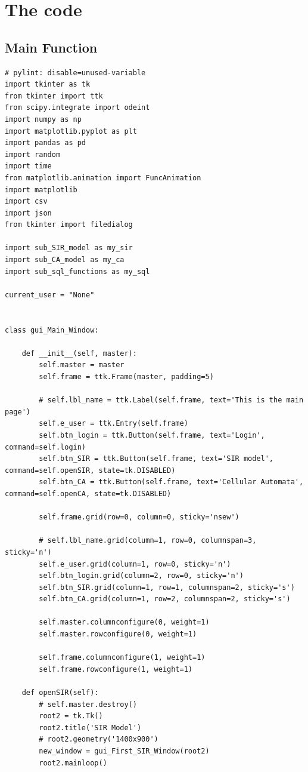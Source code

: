 \documentclass[11pt, a4paper]{article}
\begin{document}
\newpage
\newpage
\section{The code}

\subsection{Main Function}
\begin{lstlisting}
# pylint: disable=unused-variable
import tkinter as tk
from tkinter import ttk
from scipy.integrate import odeint
import numpy as np
import matplotlib.pyplot as plt
import pandas as pd
import random
import time
from matplotlib.animation import FuncAnimation
import matplotlib
import csv
import json
from tkinter import filedialog

import sub_SIR_model as my_sir
import sub_CA_model as my_ca
import sub_sql_functions as my_sql

current_user = "None"


class gui_Main_Window:

    def __init__(self, master):
        self.master = master
        self.frame = ttk.Frame(master, padding=5)

        # self.lbl_name = ttk.Label(self.frame, text='This is the main page')
        self.e_user = ttk.Entry(self.frame)
        self.btn_login = ttk.Button(self.frame, text='Login', command=self.login)
        self.btn_SIR = ttk.Button(self.frame, text='SIR model', command=self.openSIR, state=tk.DISABLED)
        self.btn_CA = ttk.Button(self.frame, text='Cellular Automata', command=self.openCA, state=tk.DISABLED)

        self.frame.grid(row=0, column=0, sticky='nsew')

        # self.lbl_name.grid(column=1, row=0, columnspan=3, sticky='n')
        self.e_user.grid(column=1, row=0, sticky='n')
        self.btn_login.grid(column=2, row=0, sticky='n')
        self.btn_SIR.grid(column=1, row=1, columnspan=2, sticky='s')
        self.btn_CA.grid(column=1, row=2, columnspan=2, sticky='s')

        self.master.columnconfigure(0, weight=1)
        self.master.rowconfigure(0, weight=1)

        self.frame.columnconfigure(1, weight=1)
        self.frame.rowconfigure(1, weight=1)

    def openSIR(self):
        # self.master.destroy()
        root2 = tk.Tk()
        root2.title('SIR Model')
        # root2.geometry('1400x900')
        new_window = gui_First_SIR_Window(root2)
        root2.mainloop()


\end{lstlisting}
\end{document}
